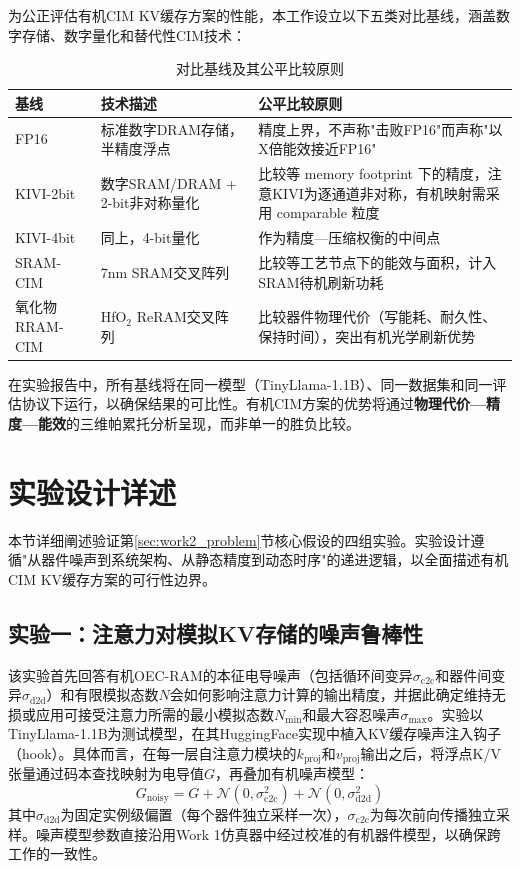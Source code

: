 为公正评估有机CIM KV缓存方案的性能，本工作设立以下五类对比基线，涵盖数字存储、数字量化和替代性CIM技术：

\begin{table}[htbp]
\centering
\caption{对比基线及其公平比较原则}
\label{tab:baselines}
\begin{tabular}{lp{4cm}p{5cm}}
\toprule
基线 & 技术描述 & 公平比较原则 \\
\midrule
FP16 & 标准数字DRAM存储，半精度浮点 & 精度上界，不声称"击败FP16"而声称"以X倍能效接近FP16" \\
KIVI-2bit & 数字SRAM/DRAM + 2-bit非对称量化~\cite{liu2024kivi} & 比较等 memory footprint 下的精度，注意KIVI为逐通道非对称，有机映射需采用 comparable 粒度 \\
KIVI-4bit & 同上，4-bit量化 & 作为精度—压缩权衡的中间点 \\
SRAM-CIM & 7nm SRAM交叉阵列~\cite{hastily2023} & 比较等工艺节点下的能效与面积，计入SRAM待机刷新功耗 \\
氧化物RRAM-CIM & HfO$_2$ ReRAM交叉阵列~\cite{huang2024retransformer} & 比较器件物理代价（写能耗、耐久性、保持时间），突出有机光学刷新优势 \\
\bottomrule
\end{tabular}
\end{table}

在实验报告中，所有基线将在同一模型（TinyLlama-1.1B）、同一数据集和同一评估协议下运行，以确保结果的可比性。有机CIM方案的优势将通过\textbf{物理代价—精度—能效}的三维帕累托分析呈现，而非单一的胜负比较。


\section{实验设计详述}
\label{sec:work2_experiments}

本节详细阐述验证第\ref{sec:work2_problem}节核心假设的四组实验。实验设计遵循"从器件噪声到系统架构、从静态精度到动态时序"的递进逻辑，以全面描述有机CIM KV缓存方案的可行性边界。

\subsection{实验一：注意力对模拟KV存储的噪声鲁棒性}
\label{sec:exp1_noise}

该实验首先回答有机OEC-RAM的本征电导噪声（包括循环间变异$\sigma_{\text{c2c}}$和器件间变异$\sigma_{\text{d2d}}$）和有限模拟态数$N$会如何影响注意力计算的输出精度，并据此确定维持无损或应用可接受注意力所需的最小模拟态数$N_{\text{min}}$和最大容忍噪声$\sigma_{\text{max}}$。实验以TinyLlama-1.1B为测试模型，在其HuggingFace实现中植入KV缓存噪声注入钩子（hook）。具体而言，在每一层自注意力模块的$k_{\text{proj}}$和$v_{\text{proj}}$输出之后，将浮点K/V张量通过码本查找映射为电导值$G$，再叠加有机噪声模型：
\begin{equation}
G_{\text{noisy}} = G + \mathcal{N}(0, \sigma_{\text{c2c}}^2) + \mathcal{N}(0, \sigma_{\text{d2d}}^2)
\label{eq:noise_model}
\end{equation}
其中$\sigma_{\text{d2d}}$为固定实例级偏置（每个器件独立采样一次），$\sigma_{\text{c2c}}$为每次前向传播独立采样。噪声模型参数直接沿用Work 1仿真器中经过校准的有机器件模型，以确保跨工作的一致性。


